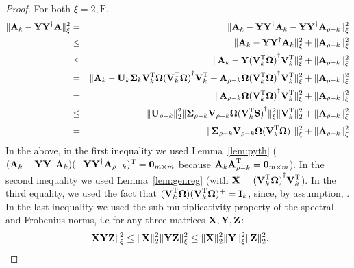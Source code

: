 \begin{proof}
For both $\xi = 2, \mathrm{F}$,
\begin{eqnarray*}
\XNormS{\matA_k - \matY \pinv{\matY} \matA}
&=&  \XNormS{\matA_k  - \matY \pinv{\matY} \matA_k -\matY \pinv{\matY}\matA_{\rho-k} }  \\
&\le& \XNormS{\matA_k - \matY \pinv{\matY} \matA_k} +   \XNormS{ \matA_{\rho-k} } \\
&\le& \XNormS{\matA_k - \matY \pinv{(\matV_k\transp \matOmega)} \matV_k\transp} +   \XNormS{ \matA_{\rho-k} }\\
&=& \XNormS{\matA_k - \matU_k \matSig_k \matV_k\transp \matOmega \pinv{(\matV_k\transp \matOmega)} \matV_k\transp   + \matA_{\rho-k}\matOmega \pinv{(\matV_k\transp \matOmega)} \matV_k\transp} +   \XNormS{ \matA_{\rho-k} } \\
&=& \XNormS{ \matA_{\rho-k}\matOmega \pinv{(\matV_k\transp \matOmega)} \matV_k\transp} +   \XNormS{ \matA_{\rho-k} } \\
&\le& \TNormS{\matU_{\rho-k}}\XNormS{ \matSig_{\rho-k} \matV_{\rho-k}\matOmega \pinv{ (\matV_k\transp \matS)} } \TNormS{\matV_k\transp} +   \XNormS{ \matA_{\rho-k} }\\
&=& \XNormS{ \matSig_{\rho-k} \matV_{\rho-k}\matOmega \pinv{ (\matV_k\transp \matOmega)} } +   \XNormS{ \matA_{\rho-k} }
\end{eqnarray*}
In the above, in the first inequality we used Lemma~\ref{lem:pyth}
($ (\matA_k  - \matY \pinv{\matY} \matA_k) (-\matY \pinv{\matY}\matA_{\rho-k})\transp = {\bf 0}_{m \times m}$
because $\matA_k \matA_{\rho-k}\transp = {\bf 0}_{m \times m}$).
In the second inequality we used Lemma~\ref{lem:genreg} (with $\matX = \pinv{(\matV_k\transp \matOmega)} \matV_k\transp$).
In the third equality, we used the fact that $(\matV_k\transp \matOmega) (\matV_k\transp \matOmega)^+=\matI_{k}$, since, by assumption,
. In the last inequality we used the sub-multiplicativity property of the spectral and Frobenius norms,
i.e for any three matrices $\matX, \matY, \matZ$:
$$\XNormS{\matX \matY \matZ} \le \TNormS{\matX} \XNormS{\matY \matZ} \le \TNormS{\matX} \XNormS{\matY} \TNormS{\matZ}.$$
\end{proof}

